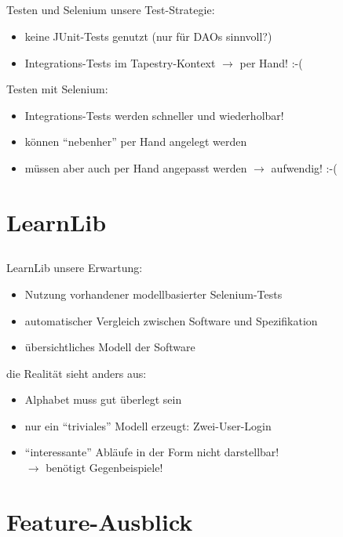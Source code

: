 \subsection*{}
\begin{frame}{Testen und Selenium}
unsere Test-Strategie:
\begin{itemize}
\item keine JUnit-Tests genutzt (nur für DAOs sinnvoll?)
\item Integrations-Tests im Tapestry-Kontext $\rightarrow$ per Hand! :-(
\end{itemize}
\pause
Testen mit Selenium:
\begin{itemize}
\item Integrations-Tests werden schneller und wiederholbar! 
\item können "`nebenher"' per Hand angelegt werden
\item müssen aber auch per Hand angepasst werden $\rightarrow$ aufwendig! :-(
\end{itemize}
\end{frame}

\section{LearnLib}
\subsection*{}
\begin{frame}{LearnLib}
unsere Erwartung:
\begin{itemize}
\item Nutzung vorhandener modellbasierter Selenium-Tests
\item automatischer Vergleich zwischen Software und Spezifikation
\item übersichtliches Modell der Software
\end{itemize}
\pause
die Realität sieht anders aus:
\begin{itemize}
\item Alphabet muss gut überlegt sein
\item nur ein "`triviales"' Modell erzeugt: Zwei-User-Login
\item "`interessante"' Abläufe in der Form nicht darstellbar! \\ $\rightarrow$ benötigt Gegenbeispiele!
\end{itemize}
\end{frame}

\section{Feature-Ausblick}
